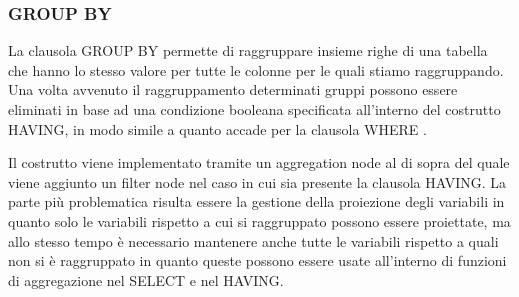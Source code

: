 \subsubsection*{GROUP BY}
La clausola GROUP BY permette di raggruppare insieme righe di una tabella che hanno lo stesso valore per tutte le colonne per le quali stiamo 
raggruppando. Una volta avvenuto il raggruppamento determinati gruppi possono essere eliminati in base ad una condizione booleana
specificata all'interno del costrutto HAVING, in modo simile a quanto accade per la clausola WHERE \cite{PGGroupBy}.

Il costrutto viene implementato tramite un aggregation node al di sopra del quale viene aggiunto un filter node nel caso in cui sia presente 
la clausola HAVING. La parte più problematica risulta essere la gestione della proiezione degli variabili in quanto solo le variabili rispetto 
a cui si raggruppato possono essere proiettate, ma allo stesso tempo è necessario mantenere anche tutte le variabili rispetto a quali non si
è raggruppato in quanto queste possono essere usate all'interno di funzioni di aggregazione nel SELECT e nel HAVING. 

